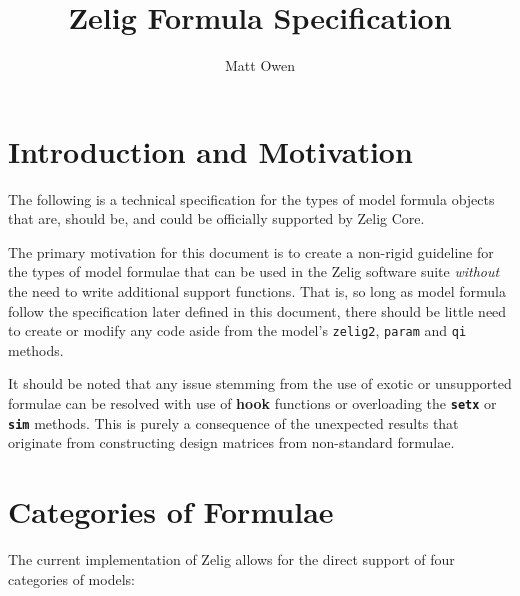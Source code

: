 \documentclass{article}
\title{Zelig Formula Specification}
\author{Matt Owen}
\begin{document}
\maketitle



%
%
%
\section{Introduction and Motivation}
\label{sec:intro}

The following is a technical specification for the types of model formula
objects that are, should be, and could be officially supported by Zelig Core.

The primary motivation for this document is to create a non-rigid guideline for
the types of model formulae that can be used in the Zelig software suite
\emph{without} the need to write additional support functions. That is, so long
as model formula follow the specification later defined in this document, there
should be little need to create or modify any code aside from the model's
{\tt zelig2}, {\tt param} and {\tt qi} methods.

It should be noted that any issue stemming from the use of exotic or unsupported
formulae can be resolved with use of {\bf hook} functions or overloading the
{\bf \tt setx} or {\bf \tt sim} methods. This is purely a consequence of the
unexpected results that originate from constructing design matrices from
non-standard formulae.



%
%
%
\section{Categories of Formulae}
\label{sec:req}

The current implementation of Zelig allows for the direct support of four
categories of models:
\end{document}
